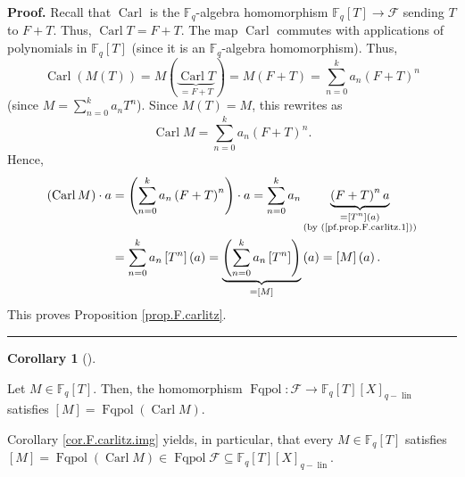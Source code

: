 \documentclass[numbers=enddot,12pt,final,onecolumn,notitlepage]{scrartcl}%
\theoremstyle{definition}
\newtheorem{coro}[theo]{Corollary}
\newenvironment{corollary}[1][]
{\begin{coro}[#1]\begin{leftbar}}
{\end{leftbar}\end{coro}}
\newenvironment{proof}[1][Proof]{\noindent\textbf{#1.} }{\ \rule{0.5em}{0.5em}}
\let\sumnonlimits\sum
\renewcommand{\sum}{\sumnonlimits\limits}
\begin{document}
\begin{proof}
Recall that $\operatorname*{Carl}$ is the $\mathbb{F}_{q}$-algebra
homomorphism $\mathbb{F}_{q}\left[  T\right]  \rightarrow\mathcal{F}$ sending
$T$ to $F+T$. Thus, $\operatorname*{Carl}T=F+T$. The map $\operatorname*{Carl}%
$ commutes with applications of polynomials in $\mathbb{F}_{q}\left[
T\right]  $ (since it is an $\mathbb{F}_{q}$-algebra homomorphism). Thus,%
\[
\operatorname*{Carl}\left(  M\left(  T\right)  \right)  =M\left(
\underbrace{\operatorname*{Carl}T}_{=F+T}\right)  =M\left(  F+T\right)
=\sum_{n=0}^{k}a_{n}\left(  F+T\right)  ^{n}%
\]
(since $M=\sum_{n=0}^{k}a_{n}T^{n}$). Since $M\left(  T\right)  =M$, this
rewrites as%
\[
\operatorname*{Carl}M=\sum_{n=0}^{k}a_{n}\left(  F+T\right)  ^{n}.
\]
Hence,%
\begin{align*}
\left(  \operatorname*{Carl}M\right)  \cdot a  &  =\left(  \sum_{n=0}^{k}%
a_{n}\left(  F+T\right)  ^{n}\right)  \cdot a=\sum_{n=0}^{k}a_{n}%
\underbrace{\left(  F+T\right)  ^{n}a}_{\substack{=\left[  T^{n}\right]
\left(  a\right)  \\\text{(by (\ref{pf.prop.F.carlitz.1}))}}}\\
&  =\sum_{n=0}^{k}a_{n}\left[  T^{n}\right]  \left(  a\right)
=\underbrace{\left(  \sum_{n=0}^{k}a_{n}\left[  T^{n}\right]  \right)
}_{=\left[  M\right]  }\left(  a\right)  =\left[  M\right]  \left(  a\right)
.
\end{align*}
This proves Proposition \ref{prop.F.carlitz}.
\end{proof}

\begin{corollary}
\label{cor.F.carlitz.img}Let $M\in\mathbb{F}_{q}\left[  T\right]  $. Then, the
homomorphism $\operatorname*{Fqpol}:\mathcal{F}\rightarrow\mathbb{F}%
_{q}\left[  T\right]  \left[  X\right]  _{q-\operatorname*{lin}}$ satisfies
$\left[  M\right]  =\operatorname*{Fqpol}\left(  \operatorname*{Carl}M\right)
$.
\end{corollary}

Corollary \ref{cor.F.carlitz.img} yields, in particular, that every
$M\in\mathbb{F}_{q}\left[  T\right]  $ satisfies $\left[  M\right]
=\operatorname*{Fqpol}\left(  \operatorname*{Carl}M\right)  \in
\operatorname*{Fqpol}\mathcal{F}\subseteq\mathbb{F}_{q}\left[  T\right]
\left[  X\right]  _{q-\operatorname*{lin}}$.
\end{document}

